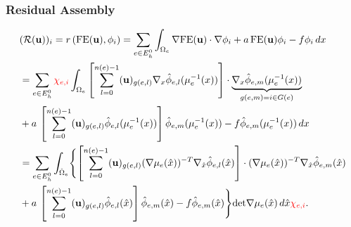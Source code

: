 \begin{frame}
\frametitle{Residual Assembly}
\begin{equation*}
\begin{split}
&(\mathcal{R}(\mathbf{u}) )_i  = r\left(\text{FE}(\mathbf{u}),\phi_i\right)
= \sum_{e\in E_h^0} \int_{\Omega_e} \nabla \text{FE}(\mathbf{u}) \cdot \nabla\phi_i 
+ a \, \text{FE}(\mathbf{u}) \phi_i - f \phi_i \,dx\\
&= \sum_{e\in E_h^0} {\color{red}\chi_{e,i}} \int_{\Omega_e} 
\left[ \sum_{l=0}^{n(e)-1} (\mathbf{u})_{g(e,l)} \nabla_x \hat\phi_{e,l}(\mu_e^{-1}(x))\right]
\cdot  \underbrace{\nabla_x \hat\phi_{e,m} (\mu_e^{-1}(x))}_{g(e,m)=i\in G(e)}\\
& + a \, \left[ \sum_{l=0}^{n(e)-1} (\mathbf{u})_{g(e,l)} \hat\phi_{e,l}(\mu_e^{-1}(x)) \right] \hat\phi_{e,m}(\mu_e^{-1}(x))
- f \hat\phi_{e,m}(\mu_e^{-1}(x)) \, dx\\
&= \sum_{e\in E_h^0} \int_{\hat\Omega_e} 
\Biggl\{\left[ \sum_{l=0}^{n(e)-1} (\mathbf{u})_{g(e,l)} (\nabla \mu_e(\hat{x}))^{-T}\nabla_{\hat{x}} \hat\phi_{e,l}(\hat{x})\right]
\cdot (\nabla \mu_e(\hat{x}))^{-T} \nabla_{\hat{x}} \hat\phi_{e,m}(\hat{x})\\
& + a \, \left[ \sum_{l=0}^{n(e)-1} (\mathbf{u})_{g(e,l)} \hat\phi_{e,l}(\hat{x}) \right] \hat\phi_{e,m}(\hat{x})
- f \hat\phi_{e,m}(\hat{x}) \Biggr\} \text{det} \nabla\mu_e(\hat{x}) \, d\hat{x} {\color{red}\chi_{e,i}} .
\end{split}
\end{equation*}
\end{frame}

